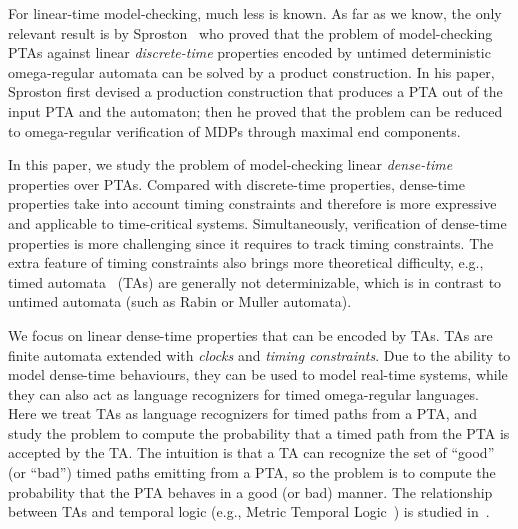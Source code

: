 For linear-time model-checking, much less is known.
As far as we know, the only relevant result is by Sproston~\cite{DBLP:conf/qest/Sproston11} who proved that the problem of model-checking PTAs against linear \emph{discrete-time} properties encoded by untimed deterministic omega-regular automata can be solved by a product construction.
In his paper, Sproston first devised a production construction that produces a PTA out of the input PTA and the automaton;
then he proved that the problem can be reduced to omega-regular verification of MDPs through maximal end components.

In this paper, we study the problem of model-checking linear \emph{dense-time} properties over PTAs.
Compared with discrete-time properties, dense-time properties take into account timing constraints and therefore is more expressive and applicable to time-critical systems.
Simultaneously, verification of dense-time properties is more challenging since it requires to track timing constraints. 
The extra feature of timing constraints also brings more theoretical difficulty, e.g., 
timed automata~\cite{DBLP:journals/tcs/AlurD94} (TAs) are generally not determinizable,
which is in contrast to untimed automata (such as Rabin or Muller automata).

We focus on linear dense-time properties that can be encoded by TAs.
TAs are finite automata extended with \emph{clocks} and \emph{timing constraints}.
Due to the ability to model dense-time behaviours,
they can be used to model real-time systems, while they can also act as language recognizers for timed omega-regular languages.
Here we treat TAs as language recognizers for timed paths from a PTA, and study
the problem to compute the probability that a timed path from the PTA is accepted by the TA.
The intuition is that a TA can recognize the set of ``good'' (or ``bad'') timed paths emitting from a PTA,
so the problem is to compute the probability that the PTA behaves in a good (or bad) manner.
The relationship between TAs and temporal logic (e.g., Metric Temporal Logic~\cite{DBLP:journals/rts/Koymans90}) is studied in~\cite{DBLP:conf/lics/OuaknineW05,DBLP:conf/tacas/OuaknineW06}.

